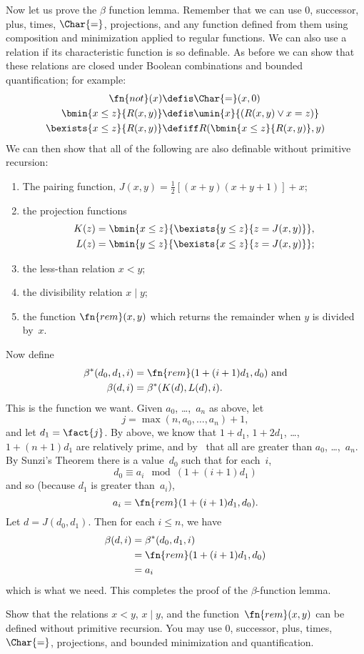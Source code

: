 \documentclass[../../../include/open-logic-section]{subfiles}
\begin{document}
Now let us prove the $\beta$ function lemma. Remember that we can use
$0$, successor, plus, times, $\Char{=}$, projections, and any function
defined from them using composition and minimization applied to
regular functions. We can also use a relation if its characteristic
function is so definable. As before we can show that these relations
are closed under Boolean combinations and bounded quantification; for
example:
\begin{align*}
\fn{not}(x) & \defis \Char{=}(x,0)\\
\bmin{x \leq z}{R(x,y)} & \defis \umin{x}{(R(x,y) \lor x = z)}\\
\bexists{x \leq z}{R(x,y)} & \defiff R(\bmin{x \leq z}{R(x,y)}, y)
\end{align*}
We can then show that all of the following are also definable without
primitive recursion:
\begin{enumerate}
\item The pairing function, $J(x,y) = \frac{1}{2}[(x+y)(x+y+1)] + x$;
\item the projection functions
\begin{align*}
K(z) & = \bmin{x \leq z}{\bexists{y \leq z}{z = J(x,y)}},\\
L(z) & = \bmin{y \leq z}{\bexists{x \leq z}{z = J(x,y)}};
\end{align*}
\item the less-than relation $x < y$;
\item the divisibility relation $x \mid y$;
\item the function $\fn{rem}(x,y)$ which returns the remainder when
  $y$ is divided by~$x$.
\end{enumerate}
Now define
\begin{align*}
\beta^*(d_0,d_1,i) & = \fn{rem}(1+(i+1) d_1,d_0) \text{ and}\\
\beta(d,i) & = \beta^*(K(d),L(d),i).
\end{align*}
This is the function we want. Given $a_0$, \dots,~$a_n$ as above, let
\[
j = \max(n,a_0,\dots,a_n)+1,
\]
and let $d_1 = \fact{j}$. By  above, we know that
$1+d_1$, $1+2 d_1$, \dots, $1+(n+1) d_1$ are relatively prime, and
by~ that all are greater than $a_0$, \dots,~$a_n$. By
Sunzi's Theorem there is a value~$d_0$ such that for each~$i$,
\[
d_0 \equiv a_i \mod (1+(i+1)d_1)
\]
and so (because $d_1$ is greater than~$a_i$),
\[
a_i = \fn{rem}(1+(i+1)d_1,d_0).
\]
Let $d = J(d_0,d_1)$. Then for each $i \le n$, we have
\begin{align*}
\beta(d,i) & =  \beta^*(d_0,d_1,i) \\
& =  \fn{rem}(1+(i+1) d_1,d_0) \\
& =  a_i
\end{align*}
which is what we need. This completes the proof of the
$\beta$-function lemma.

\begin{prob}
  Show that the relations $x < y$, $x \mid y$, and the
  function~$\fn{rem}(x,y)$ can be defined without primitive recursion.
  You may use $0$, successor, plus, times, $\Char{=}$, projections,
  and bounded minimization and quantification.
\end{prob}
\end{document}
